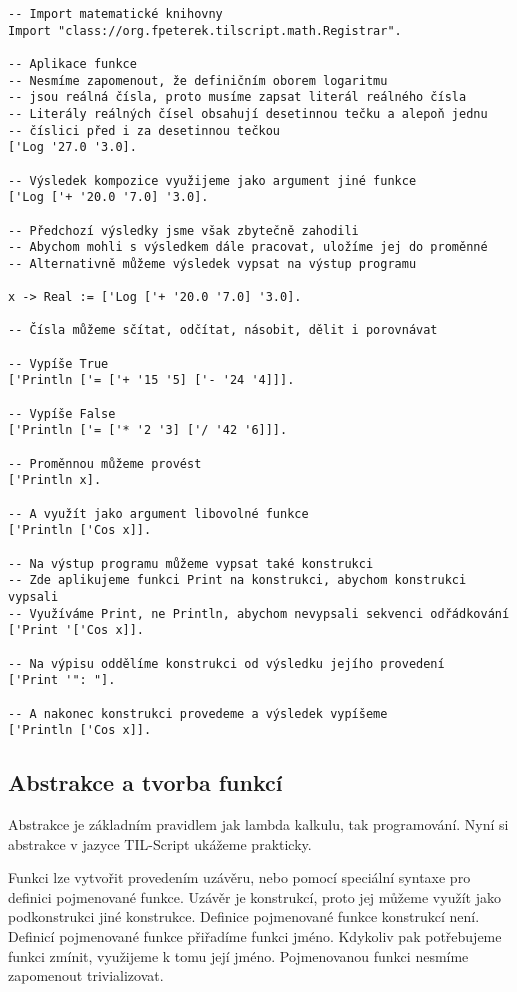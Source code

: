 \begin{lstlisting}[caption={Aritmetika v jazyce TIL-Script}]
-- Import matematické knihovny
Import "class://org.fpeterek.tilscript.math.Registrar".

-- Aplikace funkce
-- Nesmíme zapomenout, že definičním oborem logaritmu
-- jsou reálná čísla, proto musíme zapsat literál reálného čísla
-- Literály reálných čísel obsahují desetinnou tečku a alepoň jednu
-- číslici před i za desetinnou tečkou
['Log '27.0 '3.0].

-- Výsledek kompozice využijeme jako argument jiné funkce
['Log ['+ '20.0 '7.0] '3.0].

-- Předchozí výsledky jsme však zbytečně zahodili
-- Abychom mohli s výsledkem dále pracovat, uložíme jej do proměnné
-- Alternativně můžeme výsledek vypsat na výstup programu

x -> Real := ['Log ['+ '20.0 '7.0] '3.0].

-- Čísla můžeme sčítat, odčítat, násobit, dělit i porovnávat

-- Vypíše True
['Println ['= ['+ '15 '5] ['- '24 '4]]].

-- Vypíše False
['Println ['= ['* '2 '3] ['/ '42 '6]]].

-- Proměnnou můžeme provést
['Println x].

-- A využít jako argument libovolné funkce
['Println ['Cos x]].

-- Na výstup programu můžeme vypsat také konstrukci
-- Zde aplikujeme funkci Print na konstrukci, abychom konstrukci vypsali
-- Využíváme Print, ne Println, abychom nevypsali sekvenci odřádkování
['Print '['Cos x]].

-- Na výpisu oddělíme konstrukci od výsledku jejího provedení
['Print '": "].

-- A nakonec konstrukci provedeme a výsledek vypíšeme
['Println ['Cos x]].
\end{lstlisting}

\subsection{Abstrakce a tvorba funkcí}

Abstrakce je základním pravidlem jak lambda kalkulu, tak programování. Nyní si abstrakce v jazyce
TIL-Script ukážeme prakticky.

Funkci lze vytvořit provedením uzávěru, nebo pomocí speciální syntaxe pro definici pojmenované
funkce. Uzávěr je konstrukcí, proto jej můžeme využít jako podkonstrukci jiné konstrukce. Definice
pojmenované funkce konstrukcí není. Definicí pojmenované funkce přiřadíme funkci jméno. Kdykoliv
pak potřebujeme funkci zmínit, využijeme k tomu její jméno. Pojmenovanou funkci nesmíme zapomenout
trivializovat.

